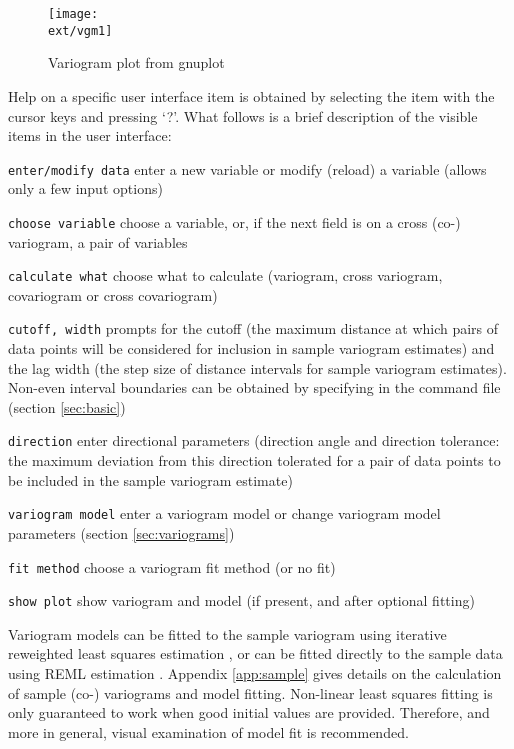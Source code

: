 \documentclass[a4paper,12pt]{book}
\newcommand{\ext}{pdf}
\renewcommand{\cite}{\citet}
\newcommand{\code}[1]{\texttt{#1}}
\newcommand{\iskey}[1]{\htmlref{\code{{#1}}}{key:#1}}
\newenvironment{codelist}{%
\begin{description}\setlength{\labelsep}{0.5cm}}{%
\end{description}}
\begin{document}
\begin{figure}[ht]
\begin{center}
 \texttt{[image: \\ext/vgm1]}
\end{center}
\caption{Variogram plot from gnuplot}
\label{fig:vario.plot}
\end{figure}

Help on a specific user interface item is obtained by selecting the item
with the cursor keys and pressing `?'. What follows is a brief
description of the visible items in the user interface:

\begin{codelist}
\item[\texttt{enter/modify data}]
enter a new variable or modify (reload) a variable (allows only a few
input options)
\item[\texttt{choose variable}]
choose a variable, or, if the next field is on a cross (co-) variogram,
a pair of variables
\item[\texttt{calculate what}]
choose what to calculate (variogram, cross variogram, covariogram or
cross covariogram)
\item[\texttt{cutoff, width}]
prompts for the cutoff (the maximum distance at which pairs of data
points will be considered for inclusion in sample variogram estimates) and
the lag width (the step size of distance intervals for sample variogram
estimates). Non-even interval boundaries can be obtained by specifying
\iskey{bounds} in the command file (section \ref{sec:basic})
\item[\texttt{direction}]
enter directional parameters (direction angle and direction tolerance:
the maximum deviation from this direction tolerated for a pair of data
points to be included in the sample variogram estimate)
\item[\texttt{variogram model}]
enter a variogram model or change variogram model parameters (section
\ref{sec:variograms})
\item[\texttt{fit method}]
choose a variogram fit method (or no fit)
\item[\texttt{show plot}]
show variogram and model (if present, and after optional fitting)
\end{codelist}

Variogram models can be fitted to the sample variogram using iterative
reweighted least squares estimation \cite{cressie85}, or can be fitted
directly to the sample data using REML estimation \cite{kitanidis85}.
Appendix \ref{app:sample} gives details on the calculation of sample
(co-) variograms and model fitting. Non-linear least squares fitting is
only guaranteed to work when good initial values are provided. Therefore,
and more in general, visual examination of model fit is recommended.
\end{document}

